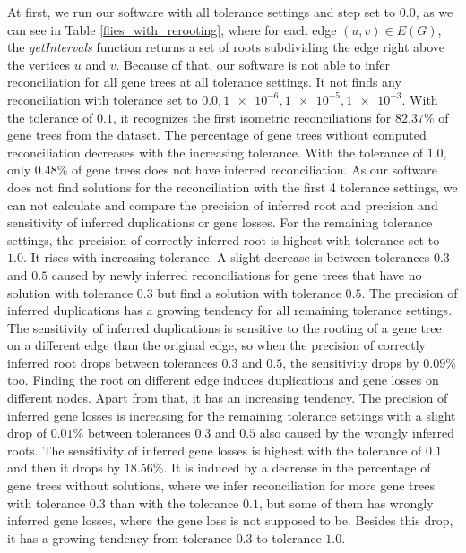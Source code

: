 At first, we run our software with all tolerance settings and step set to $0.0$, as we can see in Table \ref{flies_with_rerooting}, where for each edge $(u, v) \in E(G)$, the \emph{getIntervals} function returns a set of roots subdividing the edge right above the vertices $u$ and $v$. Because of that, our software is not able to infer reconciliation for all gene trees at all tolerance settings. It not finds any reconciliation with tolerance set to $0.0, \num{1e-6}, \num{1e-5}, \num{1e-3}$. With the tolerance of $0.1$, it recognizes the first isometric reconciliations for $82.37\%$ of gene trees from the dataset. The percentage of gene trees without computed reconciliation decreases with the increasing tolerance. With the tolerance of $1.0$, only $0.48\%$ of gene trees does not have inferred reconciliation. As our software does not find solutions for the reconciliation with the first 4 tolerance settings, we can not calculate and compare the precision of inferred root and precision and sensitivity of inferred duplications or gene losses. For the remaining tolerance settings, the precision of correctly inferred root is highest with tolerance set to $1.0$. It rises with increasing tolerance. A slight decrease is between tolerances $0.3$ and $0.5$ caused by newly inferred reconciliations for gene trees that have no solution with tolerance $0.3$ but find a solution with tolerance $0.5$. The precision of inferred duplications has a growing tendency for all remaining tolerance settings. The sensitivity of inferred duplications is sensitive to the rooting of a gene tree on a different edge than the original edge, so when the precision of correctly inferred root drops between tolerances $0.3$ and $0.5$, the sensitivity drops by $0.09\%$ too. Finding the root on different edge induces duplications and gene losses on different nodes. Apart from that, it has an increasing tendency. The precision of inferred gene losses is increasing for the remaining tolerance settings with a slight drop of $0.01\%$ between tolerances $0.3$ and $0.5$ also caused by the wrongly inferred roots. The sensitivity of inferred gene losses is highest with the tolerance of $0.1$ and then it drops by $18.56\%$. It is induced by a decrease in the percentage of gene trees without solutions, where we infer reconciliation for more gene trees with tolerance $0.3$ than with the tolerance $0.1$, but some of them has wrongly inferred gene losses, where the gene loss is not supposed to be. Besides this drop, it has a growing tendency from tolerance $0.3$ to tolerance $1.0$.

